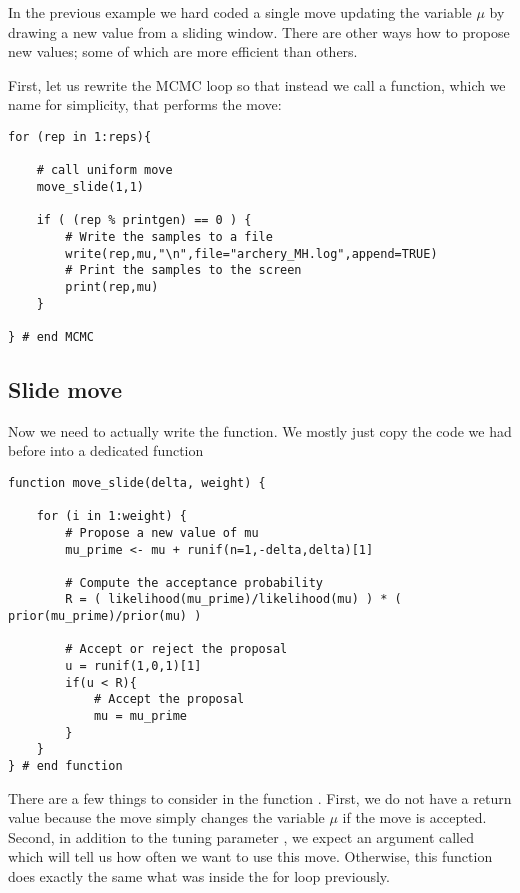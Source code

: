 In the previous example we hard coded a single move updating the variable $\mu$ by drawing a new value from a sliding window.
There are other ways how to propose new values; some of which are more efficient than others.

First, let us rewrite the MCMC loop so that instead we call a function, which we name  for simplicity, that performs the move:
{\tt \begin{snugshade*}
\begin{lstlisting}    
for (rep in 1:reps){
    
    # call uniform move
    move_slide(1,1)
    
    if ( (rep % printgen) == 0 ) {
        # Write the samples to a file
        write(rep,mu,"\n",file="archery_MH.log",append=TRUE)
        # Print the samples to the screen
        print(rep,mu)
    }

} # end MCMC
\end{lstlisting}
\end{snugshade*}}

\pagebreak\subsection{Slide move}
Now we need to actually write the  function.
We mostly just copy the code we had before into a dedicated function
{\tt \begin{snugshade*}
\begin{lstlisting}    
function move_slide(delta, weight) {

    for (i in 1:weight) {
        # Propose a new value of mu
        mu_prime <- mu + runif(n=1,-delta,delta)[1]

        # Compute the acceptance probability
        R = ( likelihood(mu_prime)/likelihood(mu) ) * ( prior(mu_prime)/prior(mu) ) 

        # Accept or reject the proposal
        u = runif(1,0,1)[1] 
        if(u < R){
            # Accept the proposal
            mu = mu_prime 
        }
    }
} # end function
\end{lstlisting}
\end{snugshade*}}
There are a few things to consider in the function .
First, we do not have a return value because the move simply changes the variable $\mu$ if the move is accepted.
Second, in addition to the tuning parameter , we expect an argument called  which will tell us how often we want to use this move.
Otherwise, this function does exactly the same what was inside the for loop previously.


